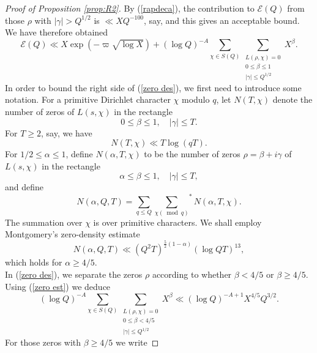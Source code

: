 \documentclass[12pt,reqno]{amsart}
\numberwithin{equation}{section}
\theoremstyle{plain}
\theoremstyle{definition}
\theoremstyle{remark}
\begin{document}
\begin{proof}[Proof of Proposition \ref{prop:R2}]
By (\ref{rapdeca}), the contribution to $\mathcal{E}(Q)$ from those $\rho$ with $|\gamma|>Q^{1 / 2}$ is $\ll X Q^{-100}$, say, and this gives an acceptable bound. We have therefore obtained
\begin{equation}\label{zero des}
\mathcal{E}(Q)\ll X\exp (-\varpi \sqrt{\log X})+{(\log Q)}^{-A}\sum_{\chi \in S(Q)}\sum_{\substack{L(\rho, \chi)=0 \\ 0 \leq \beta \leq 1\\ |\gamma|\leq Q^{1/2}}} X^{\beta}.
\end{equation}
In order to bound the right side of (\ref{zero des}), we first need to introduce some notation. For a primitive Dirichlet character $\chi$ modulo $q$, let $N(T, \chi)$ denote the number of zeros of $L(s, \chi)$ in the rectangle
\begin{equation*}
0 \leq \beta \leq 1, \quad|\gamma| \leq T.
\end{equation*}
For $T \geq 2$, say, we have \cite[chapter 12]{Da00}
\begin{equation}\label{zero est}
N(T, \chi) \ll T \log (q T).
\end{equation}
For $1 / 2 \leq \alpha \leq 1$, define $N(\alpha, T, \chi)$ to be the number of zeros $\rho=\beta+i \gamma$ of $L(s, \chi)$ in the rectangle
\begin{equation*}
\alpha \leq \beta \leq 1, \quad|\gamma| \leq T,
\end{equation*}
and define
\begin{equation*}
N(\alpha, Q, T)=\sum_{q \leq Q} {\sum_{\chi(\bmod q)}}^{*} N(\alpha, T, \chi) .
\end{equation*}
The summation over $\chi$ is over primitive characters. We shall employ Montgomery's zero-density estimate \cite[Theroem 1]{Mo69}
\begin{equation}\label{Mon's est}
N(\alpha, Q, T) \ll(Q^2 T)^{\frac{5}{2}(1-\alpha)}{(\log QT)}^{13},
\end{equation}
which holds for $\alpha \geq 4 / 5$.\\
In (\ref{zero des}), we separate the zeros $\rho$ according to whether $\beta<4 / 5$ or $\beta \geq 4 / 5$. Using (\ref{zero est}) we deduce
\begin{equation}\label{beta<}
{(\log Q)}^{-A} \sum_{\chi \in S(Q)} \sum_{\substack{L(\rho, \chi)=0 \\ 0 \leq \beta<4 / 5 \\|\gamma| \leq Q^{1 / 2}}} X^\beta \ll {(\log Q)}^{-A+1}X^{4 / 5} Q^{3/2}.
\end{equation}
For those zeros with $\beta \geq 4 / 5$ we write

\end{proof}
\end{document}
